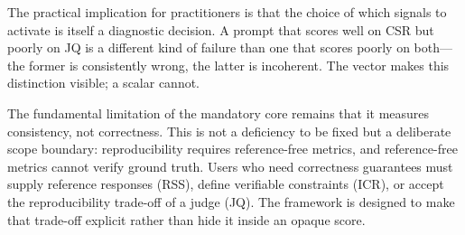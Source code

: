 \documentclass[11pt,a4paper]{article}
\begin{document}
The practical implication for practitioners is that the choice of which signals to activate is itself a diagnostic decision. A prompt that scores well on CSR but poorly on JQ is a different kind of failure than one that scores poorly on both---the former is consistently wrong, the latter is incoherent. The vector makes this distinction visible; a scalar cannot.

The fundamental limitation of the mandatory core remains that it measures consistency, not correctness. This is not a deficiency to be fixed but a deliberate scope boundary: reproducibility requires reference-free metrics, and reference-free metrics cannot verify ground truth. Users who need correctness guarantees must supply reference responses (RSS), define verifiable constraints (ICR), or accept the reproducibility trade-off of a judge (JQ). The framework is designed to make that trade-off explicit rather than hide it inside an opaque score.



\end{document}

